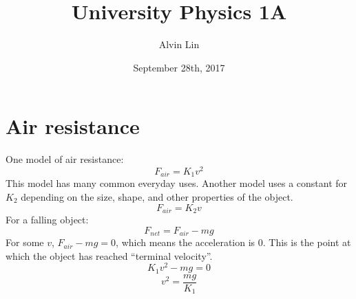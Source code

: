 \documentclass[letterpaper, 12pt]{math}
\title{University Physics 1A}
\author{Alvin Lin}
\date{September 28th, 2017}
\begin{document}
\maketitle

\section*{Air resistance}
One model of air resistance:
\[ F_{air} = K_1v^2 \]
This model has many common everyday uses. Another model uses a constant for
\( K_2 \) depending on the size, shape, and other properties of the
object.
\[ F_{air} = K_2v \]
For a falling object:
\[ F_{net} = F_{air}-mg \]
For some \( v \), \( F_{air}-mg = 0 \), which means the acceleration is 0. This
is the point at which the object has reached ``terminal velocity''.
\[ K_1v^2-mg = 0 \]
\[ v^2 = \frac{mg}{K_1} \]
\end{document}
